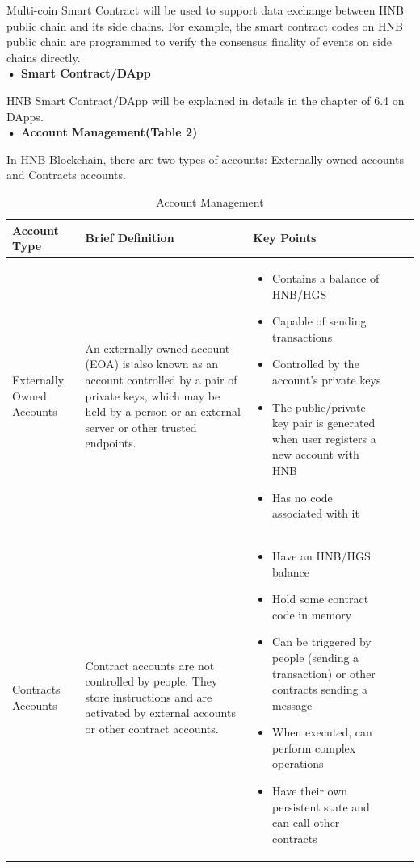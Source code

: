 \documentclass[fleqn,10pt]{SelfArx} %
\begin{document}
Multi-coin Smart Contract will be used to support data exchange between HNB public chain and its side chains. For example, the smart contract codes on HNB public chain are programmed to verify the consensus finality of events on side chains directly. \\

\textbf {•	Smart Contract/DApp}

HNB Smart Contract/DApp will be explained in details in the chapter of 6.4 on DApps. \\

\textbf {•	Account Management(Table 2)}

In HNB Blockchain, there are two types of accounts: Externally owned accounts and Contracts accounts.\\

\begin{table}[hbt]
\caption{Account Management}
\centering
\begin{tabular}{lp{4cm}p{8cm}p{14cm}r}
\toprule
Account Type & Brief Definition & Key Points \\
\midrule
Externally
Owned
Accounts
 & 
An externally owned account (EOA) is also known as an account controlled by a pair of private keys, which may be held by a person or an external server or other trusted endpoints.
 & 
\begin{itemize}
\item{Contains a balance of HNB/HGS}
\item{Capable of sending transactions}
\item{Controlled by the account’s private keys}
\item{The public/private key pair is generated when user registers a new account with HNB}
\item{Has no code associated with it}
\end{itemize}
\\
\midrule
Contracts
Accounts
 & 
Contract accounts are not controlled by people. They store instructions and are activated by external accounts or other contract accounts.
 & 
\begin{itemize}
\item{Have an HNB/HGS balance}
\item{Hold some contract code in memory}
\item{Can be triggered by people (sending a transaction) or other contracts sending a message
}   \item{When executed, can perform complex operations}
\item{Have their own persistent state and can call other contracts}

\end{itemize}
\end{tabular}
\end{table}
\end{document}
